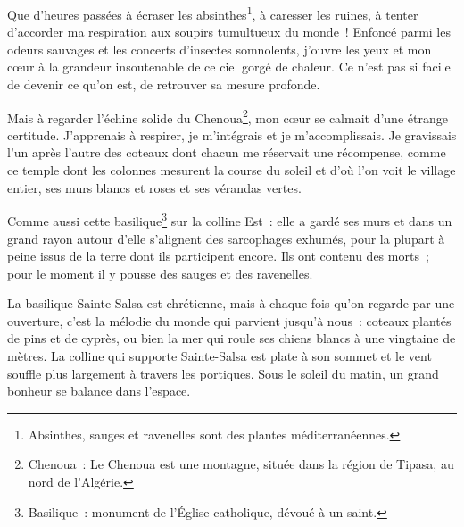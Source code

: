 {Que d'heures passées à écraser les absinthes\footnote{Absinthes,
sauges et ravenelles sont des plantes méditerranéennes.}, à caresser
les ruines, à tenter d'accorder ma respiration aux soupirs tumultueux
du monde~! Enfoncé parmi les odeurs sauvages et les concerts
d'insectes somnolents, j'ouvre les yeux et mon cœur à la grandeur
insoutenable de ce ciel gorgé de chaleur. Ce n'est pas si facile de
devenir ce qu'on est, de retrouver sa mesure profonde.

Mais à regarder l'échine solide du Chenoua\footnote{Chenoua~: Le
Chenoua est une montagne, située dans la région de Tipasa, au nord de
l'Algérie.}, mon cœur se calmait d'une étrange certitude. J'apprenais
à respirer, je m'intégrais et je m'accomplissais. Je gravissais l'un
après l'autre des coteaux dont chacun me réservait une récompense,
comme ce temple dont les colonnes mesurent la course du soleil et
d'où l'on voit le village entier, ses murs blancs et roses et ses
vérandas vertes.

Comme aussi cette basilique\footnote{Basilique~: monument de l'Église
catholique, dévoué à un saint.} sur la colline Est~: elle a gardé ses
murs et dans un grand rayon autour d'elle s'alignent des sarcophages
exhumés, pour la plupart à peine issus de la terre dont ils
participent encore. Ils ont contenu des morts~; pour le moment il y
pousse des sauges et des ravenelles.

La basilique Sainte-Salsa est chrétienne, mais à chaque fois qu'on
regarde par une ouverture, c'est la mélodie du monde qui parvient
jusqu'à nous~: coteaux plantés de pins et de cyprès, ou bien la mer
qui roule ses chiens blancs à une vingtaine de mètres. La colline qui
supporte Sainte-Salsa est plate à son sommet et le vent souffle plus
largement à travers les portiques. Sous le soleil du matin, un grand
bonheur se balance dans l'espace.
}

